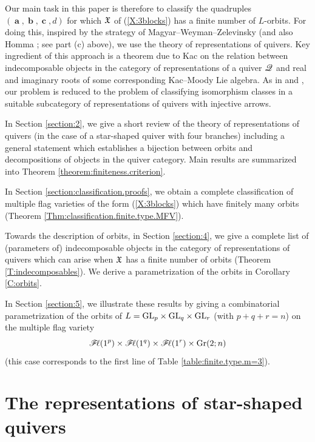 \documentclass[12pt,reqno]{amsart}
\begin{document}
Our main task in this paper is therefore to classify the quadruples $(\mbfa,\mbfb,\mbfc,d)$ for which $\mathfrak{X}$ of (\ref{X:3blocks}) has a finite number of $L$-orbits.
For doing this, inspired by the strategy of Magyar--Weyman--Zelevinsky \cite{MWZ.1999}
(and also Homma \cite{Homma.2021}; see part (c) above),
we use the theory of representations of quivers.
Key ingredient of this approach is a theorem due to Kac \cite{Kac.Quiver.1980} %
on the relation between indecomposable objects in the category of representations of a quiver $\mathscr{Q}$ and real and imaginary roots of some corresponding Kac--Moody Lie algebra.
As in \cite{MWZ.1999} and \cite{Homma.2021}, our problem is reduced to the problem of classifying isomorphism classes in a suitable subcategory of representations of quivers with injective arrows.

In Section \ref{section:2}, we give a short review of the theory of representations of quivers (in the case of a star-shaped quiver with four branches)
including %
a general statement which establishes
a bijection between orbits and
decompositions of objects in the quiver category.
Main results are summarized into Theorem \ref{theorem:finiteness.criterion}.

In Section \ref{section:classification.proofs},
we obtain a complete classification of multiple flag varieties of the form (\ref{X:3blocks}) which have finitely many orbits
(Theorem \ref{Thm:classification.finite.type.MFV}).

Towards the description of orbits, in Section \ref{section:4},
we give a complete list of (parameters of) indecomposable objects in the category of representations of quivers which can arise when $\mathfrak{X}$ has a finite number of orbits (Theorem \ref{T:indecomposables}).
We derive a parametrization of the orbits in Corollary \ref{C:orbits}.

In Section \ref{section:5}, we illustrate these results by giving a combinatorial parametrization of the orbits of
$L=\mathrm{GL}_p\times \mathrm{GL}_q\times \mathrm{GL}_r$ (with $p+q+r=n$)
on the multiple flag variety
$$
\mathscr{F}\!\ell(1^p)\times \mathscr{F}\!\ell(1^q)\times \mathscr{F}\!\ell(1^r)\times \mathrm{Gr}(2;n)
$$
(this case corresponds to the first line of Table \ref{table:finite.type.m=3}).



\section{The representations of star-shaped quivers}
\end{document}
